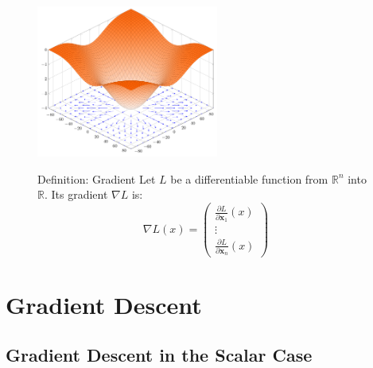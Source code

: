 \documentclass{book}
\newcommand{\x}{\mathbf{x}}
\newcommand{\loss}{L}
\newcommand{\R}{\mathbb{R}}
\begin{document}
\begin{figure}[h]
    \centering
    \begin{minipage}{.6\textwidth}
        \centering
        \includegraphics[height=5cm]{3d-gradient-cos.png}
    \end{minipage}%
    \begin{minipage}{.4\textwidth}
        \begin{myblock}{Definition: Gradient}
        Let $\loss$ be a differentiable function from $\R^n$ into $\R$. Its gradient $\nabla\loss$ is:
        \[
        \nabla \loss (x) =
        \begin{pmatrix}
        \frac{\partial \loss}{\partial \x_1}(x) \\
        \vdots \\
        \frac{\partial \loss}{\partial \x_n}(x)
        \end{pmatrix}
        \]
        \end{myblock}
    \end{minipage}
\end{figure}

\section{Gradient Descent}

\subsection{Gradient Descent in the Scalar Case}
\end{document}
